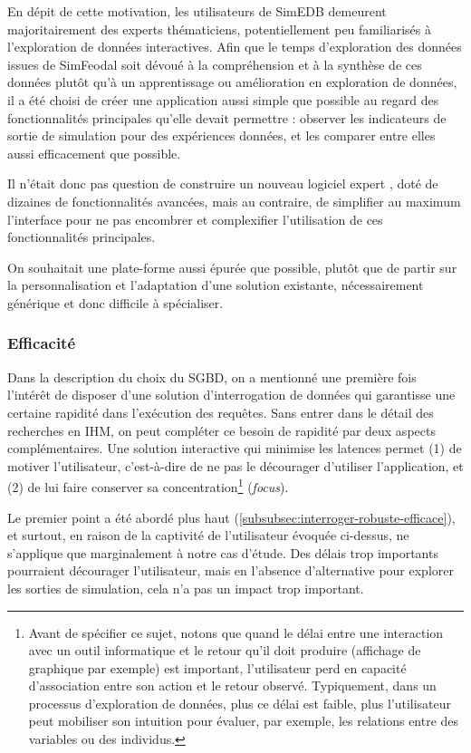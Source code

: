 En dépit de cette motivation, les utilisateurs de SimEDB demeurent majoritairement des experts thématiciens, potentiellement peu familiarisés à l'exploration de données interactives.
Afin que le temps d'exploration des données issues de SimFeodal soit dévoué à la compréhension et à la synthèse de ces données plutôt qu'à un apprentissage ou amélioration en exploration de données, il a été choisi de créer une application aussi simple que possible au regard des fonctionnalités principales qu'elle devait permettre : observer les indicateurs de sortie de simulation pour des expériences données, et les comparer entre elles aussi efficacement que possible.

Il n'était donc pas question de construire un nouveau \og logiciel expert \fg{}, doté de dizaines de fonctionnalités avancées, mais au contraire, de simplifier au maximum l'interface pour ne pas encombrer et complexifier l'utilisation de ces fonctionnalités principales.

On souhaitait une plate-forme aussi épurée que possible, plutôt que de partir sur la personnalisation et l'adaptation d'une solution existante, nécessairement générique et donc difficile à spécialiser.


\subsubsection{Efficacité}

Dans la description du choix du SGBD, on a mentionné une première fois l'intérêt de disposer d'une solution d'interrogation de données qui garantisse une certaine rapidité dans l'exécution des requêtes.
Sans entrer dans le détail des recherches en IHM, on peut compléter ce besoin de rapidité par deux aspects complémentaires.
Une solution interactive qui minimise les latences permet (1) de motiver l'utilisateur, c'est-à-dire de ne pas le décourager d'utiliser l'application, et (2) de lui faire conserver sa concentration\footnote{
	Avant de spécifier ce sujet, notons que quand le délai entre une interaction avec un outil informatique et le retour qu'il doit produire (affichage de graphique par exemple) est important, l'utilisateur perd en capacité d'association entre son action et le retour observé.
	Typiquement, dans un processus d'exploration de données, plus ce délai est faible, plus l'utilisateur peut mobiliser son intuition pour évaluer, par exemple, les relations entre des variables ou des individus.
} (\textit{focus}).

Le premier point a été abordé plus haut (\cref{subsubsec:interroger-robuste-efficace}), et surtout, en raison de la \og captivité\fg{} de l'utilisateur évoquée ci-dessus, ne s'applique que marginalement à notre cas d'étude.
Des délais trop importants pourraient décourager l'utilisateur, mais en l'absence d'alternative pour explorer les sorties de simulation, cela n'a pas un impact trop important.

